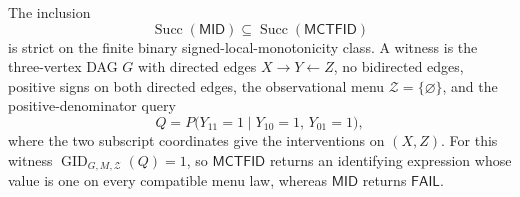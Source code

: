The inclusion
\[
 \operatorname{Succ}(\mathsf{MID})
 \subseteq
 \operatorname{Succ}(\mathsf{MCTFID})
\]
is strict on the finite binary signed-local-monotonicity class.  A witness is the three-vertex DAG \(G\) with directed edges \(X\to Y\leftarrow Z\), no bidirected edges, positive signs on both directed edges, the observational menu \(\mathcal Z=\{\varnothing\}\), and the positive-denominator query
\[
 Q=P\bigl(Y_{11}=1\mid Y_{10}=1,\,Y_{01}=1\bigr),
\]
where the two subscript coordinates give the interventions on \((X,Z)\).  For this witness \(\operatorname{GID}_{G,M,\mathcal Z}(Q)=1\), so \(\mathsf{MCTFID}\) returns an identifying expression whose value is one on every compatible menu law, whereas \(\mathsf{MID}\) returns \(\mathsf{FAIL}\).